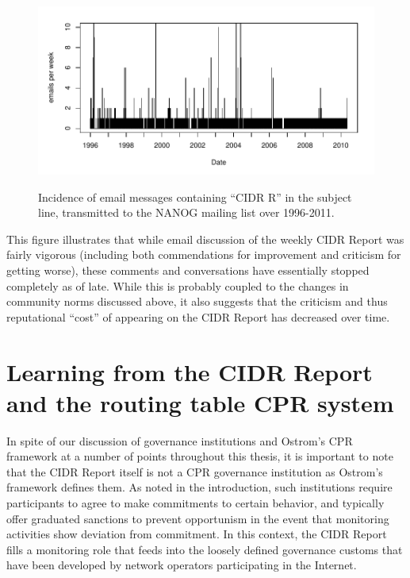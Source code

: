 \begin{figure}[h]
\begin{center}
    \includegraphics[width=6in]{figures/cr_email_freq.pdf}
    \vspace{-2em}\\
    \caption{Incidence of email messages containing ``CIDR R'' in the subject
    line, transmitted to the NANOG mailing list over 1996-2011.}
    \label{fig:mail-freq}
\end{center}
\end{figure}

This figure illustrates that while email discussion of the weekly CIDR Report
was fairly vigorous (including both commendations for improvement and criticism
for getting worse), these comments and conversations have essentially stopped
completely as of late. While this is probably coupled to the changes in
community norms discussed above, it also suggests that the criticism and thus
reputational ``cost'' of appearing on the CIDR Report has decreased over time.

\section{Learning from the CIDR Report and the routing table CPR system}

In spite of our discussion of governance institutions and Ostrom's CPR
framework at a number of points throughout this thesis, it is important to note
that the CIDR Report itself is not a CPR governance institution as Ostrom's
framework defines them. As noted in the introduction, such institutions require
participants to agree to make commitments to certain behavior, and typically
offer graduated sanctions to prevent opportunism in the event that monitoring
activities show deviation from commitment. In this context, the CIDR Report
fills a monitoring role that feeds into the loosely defined governance
customs that have been developed by network operators participating in the
Internet.

